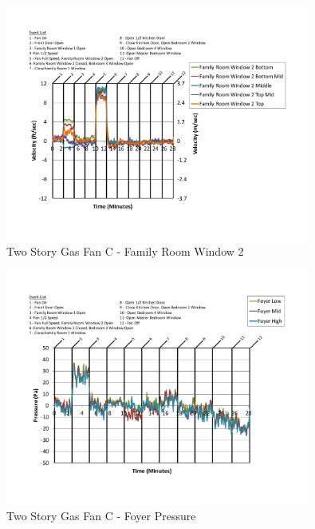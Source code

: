 \documentclass{article}
\begin{document}
\begin{appendices}
	\begin{figure}[H]
		\centering
		\includegraphics[height=3.05in,trim=0.67in 1.1in 0.67in 0.8in,clip=true]{0_Images/Results_Charts/ColdFlow/Two_Story/Gas/C/Family_Room_Window_2.pdf}
		\caption{Two Story Gas Fan C - Family Room Window 2}
	\end{figure}
 

	\begin{figure}[H]
		\centering
		\includegraphics[height=3.05in,trim=0.67in 1.1in 0.67in 0.8in,clip=true]{0_Images/Results_Charts/ColdFlow/Two_Story/Gas/C/Foyer_Pressure.pdf}
		\caption{Two Story Gas Fan C - Foyer Pressure}
	\end{figure}
 
	\clearpage


\end{appendices}
\end{document}
